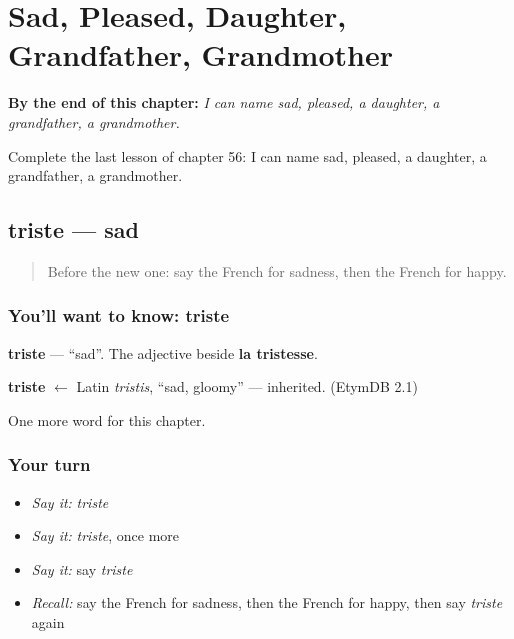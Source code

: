 
\chapter{Sad, Pleased, Daughter, Grandfather, Grandmother}
\label{ch:fr-sad-pleased-daughter-grandfather-grandmother}

\begin{chapteropening}
\textbf{By the end of this chapter:} \emph{I can name sad, pleased, a daughter, a grandfather, a grandmother.}

Complete the last lesson of chapter 56: I can name sad, pleased, a daughter, a grandfather, a grandmother.
\end{chapteropening}

\section[triste]{triste — sad}

\label{lesson:FR-C56-triste}



\begin{quote}
Before the new one: say the French for sadness, then the French for happy.
\end{quote}

\subsection*{You'll want to know: triste}
\textbf{triste} — \textquotedblleft{}sad\textquotedblright{}. The adjective beside \textbf{la tristesse}.

\begin{cousinweb}
\textbf{triste} $\leftarrow$ Latin \emph{tristis}, \textquotedblleft{}sad, gloomy\textquotedblright{} — inherited. (EtymDB 2.1)
\end{cousinweb}

\begin{grammarlens}[title={What you've built}]
One more word for this chapter.
\end{grammarlens}

\subsection*{Your turn}
\begin{itemize}
\raggedright
  \item \emph{Say it:} \emph{triste}
  \item \emph{Say it:} \emph{triste}, once more
  \item \emph{Say it:} say \emph{triste}
  \item \emph{Recall:} say the French for sadness, then the French for happy, then say \emph{triste} again
\end{itemize}

